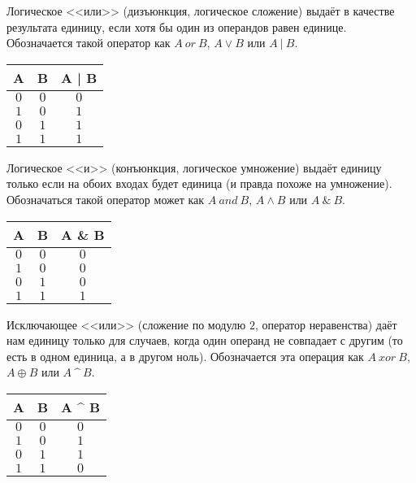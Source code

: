 Логическое <<или>> (дизъюнкция, логическое сложение) выдаёт в качестве результата единицу,
если хотя бы один из операндов равен единице. Обозначается такой оператор как $A\ or\ B$, $A \vee B$
или $A\ |\ B$.

\begin{center}
\begin{tabular}{|c|c|c|}
 \hline
 \textbf{A} & \textbf{B} & \textbf{A | B} \\ \hline
 $0$ & $0$ & $0$ \\ \hline
 $1$ & $0$ & $1$ \\ \hline
 $0$ & $1$ & $1$ \\ \hline
 $1$ & $1$ & $1$ \\ \hline
\end{tabular}
\end{center}

Логическое <<и>> (конъюнкция, логическое умножение) выдаёт единицу только если на обоих
входах будет единица (и правда похоже на умножение). Обозначаться такой
оператор может как $A\ and\ B$, $A \wedge B$ или $A\ \mbox{\&}\ B$.

\begin{center}
\begin{tabular}{|c|c|c|}
 \hline
 \textbf{A} & \textbf{B} & \textbf{A \& B} \\ \hline
 $0$ & $0$ & $0$ \\ \hline
 $1$ & $0$ & $0$ \\ \hline
 $0$ & $1$ & $0$ \\ \hline
 $1$ & $1$ & $1$ \\ \hline
\end{tabular}
\end{center}

Исключающее <<или>> (сложение по модулю $2$, оператор неравенства) даёт нам единицу только для случаев,
когда один операнд не совпадает с другим (то есть в одном единица, а в другом ноль).
Обозначается эта операция как $A\ xor\ B$, $A \oplus B$ или $A\ \mbox{\textasciicircum}\ B$.

\begin{center}
\begin{tabular}{|c|c|c|}
 \hline
 \textbf{A} & \textbf{B} & \textbf{A \textasciicircum{} B} \\ \hline
 $0$ & $0$ & $0$ \\ \hline
 $1$ & $0$ & $1$ \\ \hline
 $0$ & $1$ & $1$ \\ \hline
 $1$ & $1$ & $0$ \\ \hline
\end{tabular}
\end{center}

